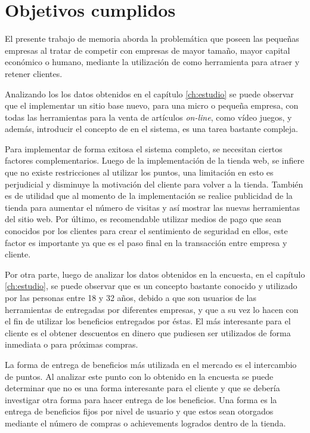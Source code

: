 \section{Objetivos cumplidos}

El presente trabajo de memoria aborda la problemática que poseen las pequeñas
empresas al tratar de competir con empresas de mayor tamaño, mayor capital
económico o humano, mediante la utilización de {\gam} como herramienta para atraer
y retener clientes.

Analizando los los datos obtenidos en el capítulo \ref{ch:estudio} se puede observar que el
implementar un sitio base nuevo, para una micro o pequeña empresa, con todas las
herramientas para la venta de artículos \emph{on-line}, como vídeo juegos, y además,
introducir el concepto de {\gam} en el sistema, es una tarea bastante compleja.

Para implementar de forma exitosa el sistema completo, se necesitan ciertos factores
complementarios. Luego de la implementación de la tienda web, 
se infiere que no existe restricciones al utilizar los puntos, una limitación
en esto es perjudicial y disminuye la motivación del cliente para volver a la tienda. 
También es de utilidad que al momento de la implementación se realice publicidad
de la tienda para aumentar el número de visitas y así mostrar las nuevas herramientas
del sitio web. Por último, es recomendable utilizar medios de pago que sean conocidos
por los clientes para crear el sentimiento de seguridad en ellos, este factor es importante
ya que es el paso final en la transacción entre empresa y cliente. 

Por otra parte, luego de analizar los datos obtenidos en la encuesta, en el capítulo \ref{ch:estudio},
 se puede observar que {\gam} es un concepto bastante conocido y utilizado por las personas 
entre 18 y 32 años, debido a que son usuarios de las herramientas de {\gam} entregadas por
diferentes empresas, y que a su vez lo hacen con el fin de utilizar los beneficios entregados 
por éstas. El más interesante para el cliente es el obtener descuentos en dinero
que pudiesen ser utilizados de forma inmediata o para próximas compras.

La forma de entrega de beneficios más utilizada en el mercado es el intercambio de puntos. 
Al analizar este punto con lo obtenido en la encuesta se puede determinar que no es 
una forma interesante para el cliente y que se debería investigar otra forma para 
hacer entrega de los beneficios. Una forma es la entrega de beneficios fijos por nivel 
de usuario y que estos sean otorgados mediante el número de compras o achievements logrados
dentro de la tienda.

